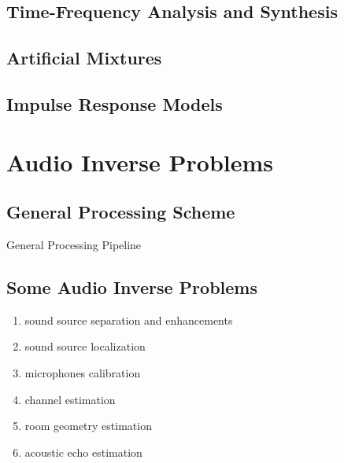 \subsection{Time-Frequency Analysis and Synthesis}

\subsection{Artificial Mixtures}

\subsection{Impulse Response Models}





\section{Audio Inverse Problems}

\subsection{General Processing Scheme}
General Processing Pipeline

\subsection{Some Audio Inverse Problems}
\begin{enumerate}
    \item sound source separation and enhancements
    \item sound source localization
    \item microphones calibration
    \item channel estimation
    \item room geometry estimation
    \item acoustic echo estimation
\end{enumerate}

